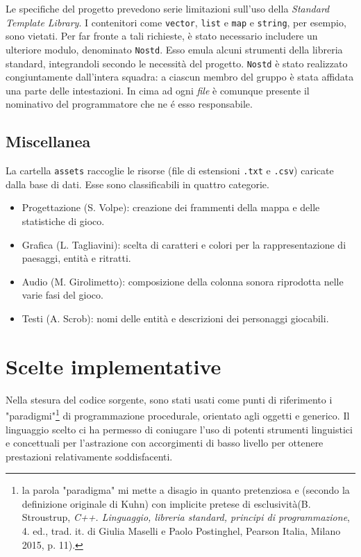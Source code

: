 \documentclass[a4paper]{article}
\begin{document}
\noindent
Le specifiche del progetto prevedono serie limitazioni sull'uso della
\emph{Standard Template Library}. I contenitori come \verb!vector!, \verb!list!
e \verb!map! e \verb!string!, per esempio, sono vietati. Per far fronte a tali
richieste, \`e stato necessario includere un ulteriore modulo, denominato
\verb!Nostd!. Esso emula alcuni strumenti della libreria standard, integrandoli
secondo le necessit\`a del progetto. \verb!Nostd! \`e stato realizzato
congiuntamente dall'intera squadra: a ciascun membro del gruppo \`e stata
affidata una parte delle intestazioni. In cima ad ogni \emph{file} \`e
comunque presente il nominativo del programmatore che ne \'e esso responsabile.

\subsection{Miscellanea}

La cartella \verb!assets! raccoglie le risorse (file di estensioni \verb!.txt! e
\verb!.csv!) caricate dalla base di dati. Esse sono classificabili in quattro
categorie.

\begin{itemize}
  \item Progettazione (S. Volpe): creazione dei frammenti della mappa e delle
    statistiche di gioco.
  \item Grafica (L. Tagliavini): scelta di caratteri e colori per la
    rappresentazione di paesaggi, entit\`a e ritratti.
  \item Audio (M. Girolimetto): composizione della colonna sonora riprodotta
    nelle varie fasi del gioco.
  \item Testi (A. Scrob): nomi delle entit\`a e descrizioni dei personaggi
    giocabili.
\end{itemize}

\section{Scelte implementative}

Nella stesura del codice sorgente, sono stati usati come punti di riferimento i
"paradigmi"\footnote{\label{note1} \guillemotleft [...] la parola "paradigma" mi
mette a disagio in quanto pretenziosa e (secondo la definizione originale di
Kuhn) con implicite pretese di esclusivit\`a\guillemotright (B. Stroustrup,
\emph{C++. Linguaggio, libreria standard, principi di programmazione}, 4. ed.,
trad. it. di Giulia Maselli e Paolo Postinghel, Pearson Italia, Milano 2015,
p. 11).} di programmazione procedurale, orientato agli oggetti e generico. Il
linguaggio scelto ci ha permesso di coniugare l'uso di potenti strumenti
linguistici e concettuali per l'astrazione con accorgimenti di basso livello per
ottenere prestazioni relativamente soddisfacenti.
\end{document}
